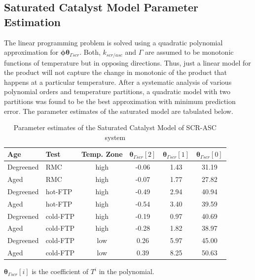 \subsection{Saturated Catalyst Model Parameter Estimation}

The linear programming problem is solved using a quadratic polynomial approximation for $\pmb \phi \pmb \theta_{\Gamma scr}$. Both, $k_{scr/asc}$ and $\Gamma$ are assumed to be monotonic functions of temperature but in opposing directions. Thus, just a linear model for the product will not capture the change in monotonic of the product that happens at a particular temperature. After a systematic analysis of various polynomial orders and temperature partitions, a quadratic model with two partitions was found to be the best approximation with minimum prediction error. The parameter estimates of the saturated model are tabulated below.

\begin{table}[H]
        \centering
        \caption{Parameter estimates of the Saturated Catalyst Model of SCR-ASC system}
        \begin{tabular}{l l c c c c}
                \hline \hline
                Age & Test & Temp. Zone &
                $\pmb \theta_{\Gamma scr}[2]$ &
                $\pmb \theta_{\Gamma scr}[1]$ &
                $\pmb \theta_{\Gamma scr}[0]$ \\ \hline \hline
                Degreened & RMC & high & -0.06 & 1.43 & 31.19 \\
                Aged & RMC & high & -0.07 & 1.77 & 27.82\\      \hline
                Degreened & hot-FTP & high & -0.49 & 2.94 & 40.94 \\
                Aged & hot-FTP & high & -0.54 & 3.40 & 39.59 \\         \hline
                Degreened & cold-FTP & high & -0.19 & 0.97 & 40.69 \\
                Aged & cold-FTP & high & -0.28 & 1.82 & 38.97\\         \hline
                Degreened & cold-FTP & low & 0.26 &  5.97 & 45.00 \\
                Aged & cold-FTP & low & 0.39 & 8.25 & 50.63 \\
                \hline \hline
        \end{tabular}

        $\pmb \theta_{\Gamma scr} [i]$ is the coefficient of $T^i$ in the polynomial.
\end{table}

